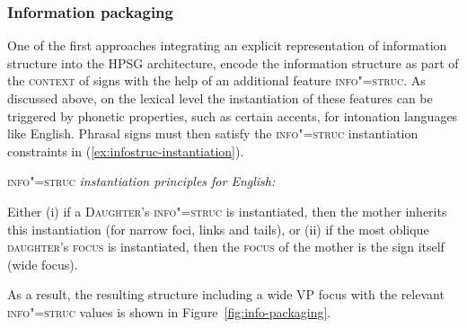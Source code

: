 \documentclass[output=paper]{langsci/langscibook}
\begin{document}
\subsubsection{Information packaging \citep{EV96a}}

One of the first approaches integrating an explicit representation of
information structure into the HPSG architecture, \cite{EV96a} encode
the information structure as part of the \textsc{context} of signs
with the help of an additional feature \textsc{info"=struc}. As
discussed above, on the lexical level the instantiation of these
features can be triggered by phonetic properties, such as certain
accents, for intonation languages like English. Phrasal signs must
then satisfy the \textsc{info"=struc} instantiation constraints in
(\ref{ex:infostruc-instantiation}).
\begin{exe}
  \ex\label{ex:infostruc-instantiation} \textsc{info"=struc} \textit{instantiation principles for English:}
  \begin{xlist}
    \exi{} Either (i) if a \textsc{Daughter}'s \textsc{info"=struc} is instantiated, then the mother inherits this instantiation (for narrow foci, links and tails),
    \exi{} or (ii) if the most oblique \textsc{daughter}'s \textsc{focus} is instantiated, then the \textsc{focus} of the mother is the sign itself (wide focus).
  \end{xlist}
\end{exe}

As a result, the resulting structure including a wide VP focus with
the relevant \textsc{info"=struc} values is shown in
Figure~\ref{fig:info-packaging}.
\end{document}
